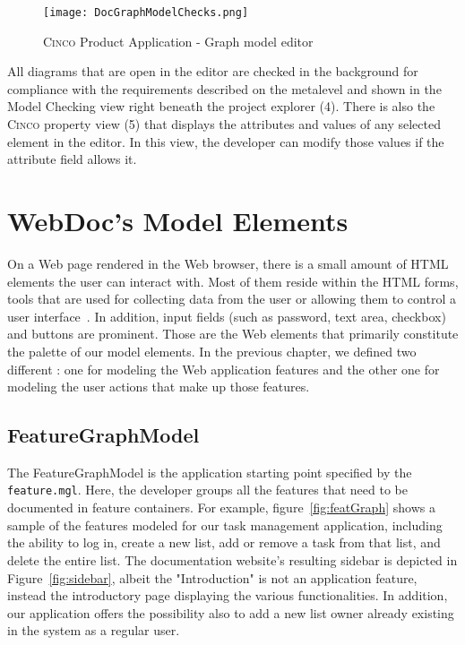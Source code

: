 \begin{figure}[h]
    \centering
    \texttt{[image: DocGraphModelChecks.png]}
    \caption{\textsc{Cinco} Product Application - Graph model editor}\label{fig:graphDSL}
\end{figure}

All diagrams that are open in the editor are checked in the background for compliance with the requirements described on the metalevel and shown in the Model Checking view right beneath the project explorer (4). There is also the \textsc{Cinco} property view (5) that displays the attributes and values of any selected element in the editor. In this view, the developer can modify those values if the attribute field allows it.

\section{WebDoc's Model Elements}\label{sec:WebDocModelElem}

On a Web page rendered in the Web browser, there is a small amount of HTML elements the user can interact with. Most of them reside within the HTML forms, tools that are used for collecting data from the user or allowing them to control a user interface~\cite{mozillaMDN}. In addition, input fields (such as password, text area, checkbox) and buttons are prominent. Those are the Web elements that primarily constitute the palette of our model elements. In the previous chapter, we defined two different : one for modeling the Web application features and the other one for modeling the user actions that make up those features.

\subsection{FeatureGraphModel}\label{sec:FeaGrahptModElem}

The FeatureGraphModel is the application starting point specified by the \lstinline{feature.mgl}. Here, the developer groups all the features that need to be documented in feature containers. For example, figure~\ref{fig:featGraph} shows a sample of the features modeled for our task management application, including the ability to log in, create a new list, add or remove a task from that list, and delete the entire list. The documentation website's resulting sidebar is depicted in Figure~\ref{fig:sidebar}, albeit the "Introduction" is not an application feature, instead the introductory page displaying the various functionalities. In addition, our application offers the possibility also to add a new list owner already existing in the system as a regular user.

